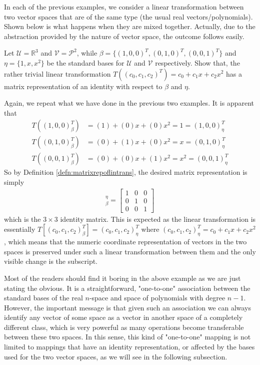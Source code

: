 In each of the previous examples, we consider a linear transformation between two vector spaces that are of the same type (the usual real vectors/polynomials). Shown below is what happens when they are mixed together. Actually, due to the abstraction provided by the nature of vector space, the outcome follows easily.
\begin{exmp}
Let $\mathcal{U} = \mathbb{R}^3$ and $\mathcal{V} = \mathcal{P}^2$, while $\mathcal{\beta} = \{(1,0,0)^T, \allowbreak (0,1,0)^T, (0,0,1)^T\}$ and $\mathcal{\eta} = \{1, x, x^2\}$ be the standard bases for $\mathcal{U}$ and $\mathcal{V}$ respectively. Show that, the rather trivial linear transformation $T((c_0, c_1, c_2)^T) = c_0 + c_1x + c_2x^2$ has a matrix representation of an identity with respect to $\mathcal{\beta}$ and $\mathcal{\eta}$.
\end{exmp}
\begin{solution}
Again, we repeat what we have done in the previous two examples. It is apparent that
\begin{align*}
T((1,0,0)^T_\beta) &= (1) + (0)x + (0)x^2 = 1 = (1,0,0)^T_\eta\\
T((0,1,0)^T_\beta) &= (0) + (1)x + (0)x^2 = x = (0,1,0)^T_\eta\\
T((0,0,1)^T_\beta) &= (0) + (0)x + (1)x^2 = x^2 = (0,0,1)^T_\eta
\end{align*}
So by Definition \ref{defn:matrixrepoflintrans}, the desired matrix representation is simply
\begin{align*}
[T]_\beta^\eta = 
\begin{bmatrix}
1 & 0 & 0 \\
0 & 1 & 0 \\
0 & 0 & 1
\end{bmatrix}
\end{align*}
which is the $3 \times 3$ identity matrix. This is expected as the linear transformation is essentially $T[(c_0, c_1, c_2)_\beta^T] = (c_0, c_1, c_2)_\eta^T$ where $(c_0, c_1, c_2)_\eta^T = c_0 + c_1x + c_2x^2$, which means that the numeric coordinate representation of vectors in the two spaces is preserved under such a linear transformation between them and the only visible change is the subscript.
\end{solution}
Most of the readers should find it boring in the above example as we are just stating the obvious. It is a straightforward, "one-to-one" association between the standard bases of the real $n$-space and space of polynomials with degree $n-1$. However, the important message is that given such an association we can always identify any vector of some space as a vector in another space of a completely different class, which is very powerful as many operations become transferable between these two spaces. In this sense, this kind of "one-to-one" mapping is not limited to mappings that have an identity representation, or affected by the bases used for the two vector spaces, as we will see in the following subsection.

